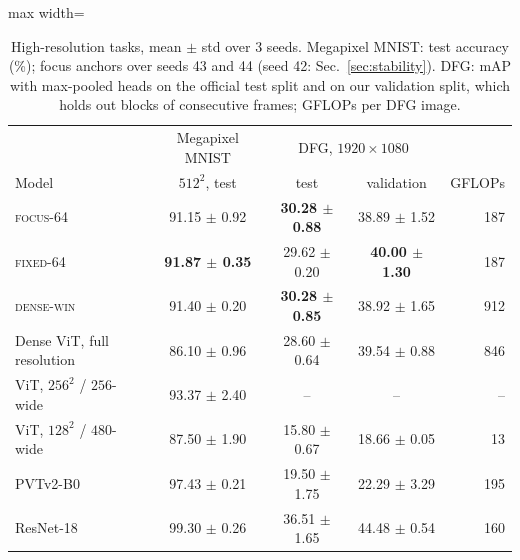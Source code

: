 \documentclass[runningheads]{llncs}
\newcommand{\focus}{\textsc{focus}}
\newcommand{\fixed}{\textsc{fixed}}
\newcommand{\densewin}{\textsc{dense-win}}
\begin{document}
\begin{table}[t]
\centering
\caption{High-resolution tasks, mean $\pm$ std over 3 seeds. Megapixel MNIST: test accuracy
(\%); focus anchors over seeds 43 and 44 (seed 42: Sec.~\ref{sec:stability}). DFG: mAP with
max-pooled heads on the official test split and on our validation split, which holds out blocks
of consecutive frames; GFLOPs per DFG image.}
\label{tab:highres}
\begin{adjustbox}{max width=\linewidth}
\begin{tabular}{lcccr}
\toprule
& Megapixel MNIST & \multicolumn{2}{c}{DFG, $1920\times1080$} & \\
Model & $512^2$, test & test & validation & GFLOPs \\
\midrule
\focus-64 & 91.15 $\pm$ 0.92 & \textbf{30.28 $\pm$ 0.88} & 38.89 $\pm$ 1.52 & 187 \\
\fixed-64 & \textbf{91.87 $\pm$ 0.35} & 29.62 $\pm$ 0.20 & \textbf{40.00 $\pm$ 1.30} & 187 \\
\densewin & 91.40 $\pm$ 0.20 & \textbf{30.28 $\pm$ 0.85} & 38.92 $\pm$ 1.65 & 912 \\
Dense ViT, full resolution & 86.10 $\pm$ 0.96 & 28.60 $\pm$ 0.64 & 39.54 $\pm$ 0.88 & 846 \\
ViT, $256^2$ / $256$-wide & 93.37 $\pm$ 2.40 & -- & -- & -- \\
ViT, $128^2$ / $480$-wide & 87.50 $\pm$ 1.90 & 15.80 $\pm$ 0.67 & 18.66 $\pm$ 0.05 & 13 \\
\midrule
PVTv2-B0 & 97.43 $\pm$ 0.21 & 19.50 $\pm$ 1.75 & 22.29 $\pm$ 3.29 & 195 \\
ResNet-18 & 99.30 $\pm$ 0.26 & 36.51 $\pm$ 1.65 & 44.48 $\pm$ 0.54 & 160 \\
\bottomrule
\end{tabular}
\end{adjustbox}
\end{table}
\end{document}
